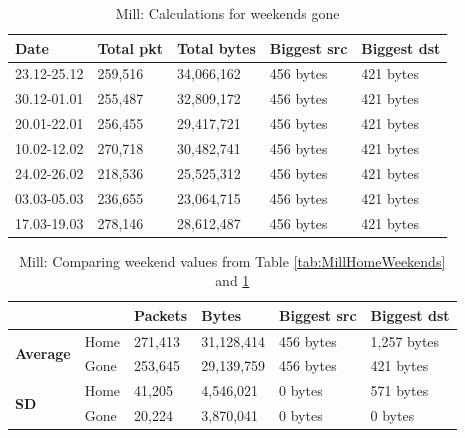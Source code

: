 \begin{table}[H]
    \centering
    \caption{Mill: Calculations for weekends gone}
    \begin{tabular}{|l|l|l|l|l|}
        \hline
        \textbf{Date}    & \textbf{Total pkt} & \textbf{Total bytes} & \textbf{Biggest src} & \textbf{Biggest dst} \\ \hline
        23.12-25.12      & 259,516            & 34,066,162           & 456 bytes            & 421 bytes            \\ \hline
        30.12-01.01      & 255,487            & 32,809,172           & 456 bytes            & 421 bytes            \\ \hline
        20.01-22.01      & 256,455            & 29,417,721           & 456 bytes            & 421 bytes            \\ \hline
        10.02-12.02      & 270,718            & 30,482,741           & 456 bytes            & 421 bytes            \\ \hline
        24.02-26.02      & 218,536            & 25,525,312           & 456 bytes            & 421 bytes            \\ \hline
        03.03-05.03      & 236,655            & 23,064,715           & 456 bytes            & 421 bytes            \\ \hline
        17.03-19.03      & 278,146            & 28,612,487           & 456 bytes            & 421 bytes            \\ \hline
    \end{tabular}
    \label{tab:MillGoneWeekends}
\end{table}

\begin{table}[H]
    \centering
    \caption{Mill: Comparing weekend values from Table \ref{tab:MillHomeWeekends} and \ref{tab:MillGoneWeekends}}
    \begin{tabular}{ll|l|l|l|l|}
        \cline{3-6}
        \textbf{}                                           & \textbf{} & \textbf{Packets} & \textbf{Bytes} & \textbf{Biggest src} & \textbf{Biggest dst} \\ \hline
        \multicolumn{1}{|l|}{\multirow{2}{*}{\textbf{Average}}} & Home      & 271,413          & 31,128,414      & 456 bytes            & 1,257 bytes          \\ \cline{2-6} 
        \multicolumn{1}{|l|}{}                              & Gone      & 253,645          & 29,139,759      & 456 bytes            & 421 bytes            \\ \hline
        \multicolumn{1}{|l|}{\multirow{2}{*}{\textbf{SD}}}  & Home      & 41,205           & 4,546,021      & 0 bytes              & 571 bytes            \\ \cline{2-6} 
        \multicolumn{1}{|l|}{}                              & Gone      & 20,224           & 3,870,041       & 0 bytes              & 0 bytes              \\ \hline
    \end{tabular}
    \label{tab:MillWeekends}
\end{table}

